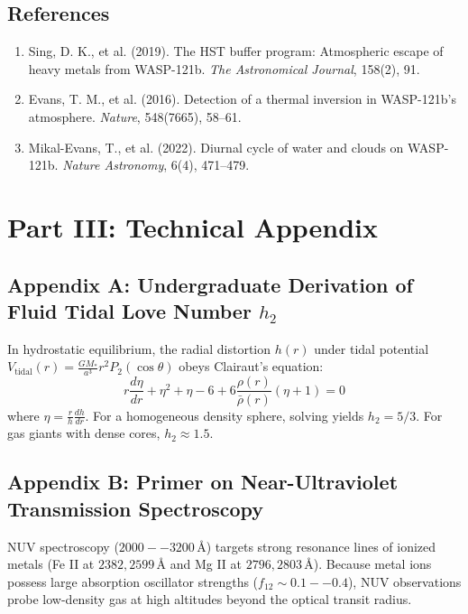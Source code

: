 \documentclass[11pt,a4paper]{article}
\begin{document}
\subsection*{References}
\begin{enumerate}
    \item Sing, D. K., et al. (2019). The HST buffer program: Atmospheric escape of heavy metals from WASP-121b. \textit{The Astronomical Journal}, 158(2), 91.
    \item Evans, T. M., et al. (2016). Detection of a thermal inversion in WASP-121b's atmosphere. \textit{Nature}, 548(7665), 58--61.
    \item Mikal-Evans, T., et al. (2022). Diurnal cycle of water and clouds on WASP-121b. \textit{Nature Astronomy}, 6(4), 471--479.
\end{enumerate}

\newpage

\section*{Part III: Technical Appendix}

\subsection*{Appendix A: Undergraduate Derivation of Fluid Tidal Love Number $h_2$}
In hydrostatic equilibrium, the radial distortion $h(r)$ under tidal potential $V_{\text{tidal}}(r) = \frac{G M_*}{a^3} r^2 P_2(\cos \theta)$ obeys Clairaut's equation:
\begin{equation}
r \frac{d\eta}{dr} + \eta^2 + \eta - 6 + 6 \frac{\rho(r)}{\bar{\rho}(r)} (\eta + 1) = 0
\end{equation}
where $\eta = \frac{r}{h} \frac{dh}{dr}$. For a homogeneous density sphere, solving yields $h_2 = 5/3$. For gas giants with dense cores, $h_2 \approx 1.5$.

\subsection*{Appendix B: Primer on Near-Ultraviolet Transmission Spectroscopy}
NUV spectroscopy ($2000--3200\,\text{\AA}$) targets strong resonance lines of ionized metals (Fe II at $2382, 2599\,\text{\AA}$ and Mg II at $2796, 2803\,\text{\AA}$). Because metal ions possess large absorption oscillator strengths ($f_{12} \sim 0.1--0.4$), NUV observations probe low-density gas at high altitudes beyond the optical transit radius.
\end{document}
